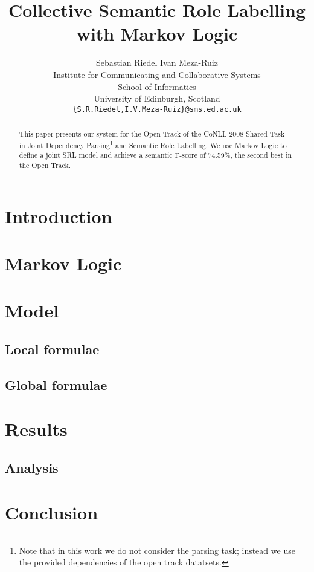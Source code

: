 \documentclass[11pt]{article}
\title{Collective Semantic Role Labelling with Markov Logic}
\author{Sebastian Riedel \qquad Ivan Meza-Ruiz\\
  Institute for Communicating and Collaborative Systems\\
  School of Informatics\\
  University of Edinburgh, Scotland\\
  {\tt\{S.R.Riedel,I.V.Meza-Ruiz\}@sms.ed.ac.uk} }
\date{}
\begin{document}
 


\maketitle
\begin{abstract}
This paper presents our system for the Open Track of the CoNLL 2008 Shared Task~\citep{surdeanu08conll} in Joint Dependency Parsing\footnote{Note that in this work we do not consider the parsing task; instead we use the provided dependencies of the open track datatsets.} and Semantic Role Labelling. We use Markov Logic to define a joint SRL model and achieve a semantic F-score of 74.59\%, the second best in the Open Track.
\end{abstract}

\section{Introduction}



\section{Markov Logic} \label{sec:markovlogic}



\section{Model} \label{sec:model} 


\subsection{Local formulae}\label{sec:local} 
 


\subsection{Global formulae}



\section{Results}\label{sec:results}


\subsection{Analysis}


\section{Conclusion} \label{sec:conclusion}




\end{document}
